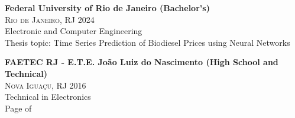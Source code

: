 \documentclass[oneside]{article}
\begin{document}
{\begin{minipage}[t][\dimexpr\textheight-2\fboxrule-2\fboxsep\relax][t]{\dimexpr0.6\textwidth-2\fboxrule-2\fboxsep\relax}
        {\large \textbf{Federal University of Rio de Janeiro (Bachelor's)}} \\
        {\scshape{}\selectfont\footnotesize Rio de Janeiro, RJ  \textendash{} 2024} \\
        {Electronic and Computer Engineering} \\[1ex]
        {\footnotesize Thesis topic: Time Series Prediction of Biodiesel Prices using Neural Networks} \\[2ex]
        \vspace{.3cm}

        {\large \textbf{FAETEC RJ - E.T.E. João Luiz do Nascimento (High School and Technical)}} \\
        {\scshape{}\selectfont\footnotesize Nova Iguaçu, RJ  \textendash{} 2016} \\
        {Technical in Electronics} \\[1ex]
        \vfill%
        {\hfill\small{}\selectfont Page \thepage of \pageref{LastPage}\hfill}
    \end{minipage}
}%
\end{document}
